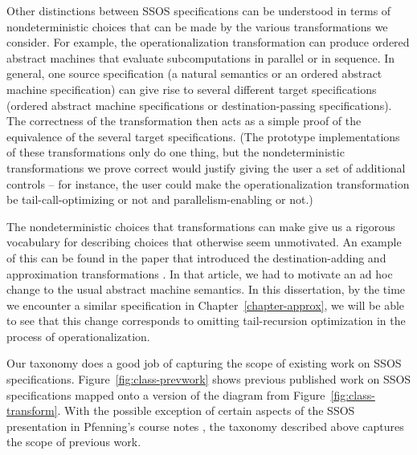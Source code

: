 Other distinctions between SSOS specifications can be understood in
terms of nondeterministic choices that can be made by the various
transformations we consider. For example, the operationalization
transformation can produce ordered abstract machines that evaluate
subcomputations in parallel or in sequence. In general, one source
specification (a natural semantics or an ordered abstract machine
specification) can give rise to several different target
specifications (ordered abstract machine specifications or
destination-passing specifications). The correctness of the
transformation then acts as a simple proof of the equivalence of the
several target specifications. (The prototype implementations of these
transformations only do one thing, but the nondeterministic
transformations we prove correct would justify giving the user a set
of additional controls -- for instance, the user could make the
operationalization transformation be tail-call-optimizing or
not and parallelism-enabling or not.)

The nondeterministic choices that transformations can make give us a
rigorous vocabulary for describing choices that otherwise seem
unmotivated. An example of this can be found in the paper that
introduced the destination-adding and approximation transformations
\cite{simmons11logical}. In that article, we had to motivate an ad hoc
change to the usual abstract machine semantics. In this dissertation,
by the time we encounter a similar specification in
Chapter~\ref{chapter-approx}, we will be able to see that this change
corresponds to omitting tail-recursion optimization in the process of
operationalization.

Our taxonomy does a good job of capturing the scope of existing work
on SSOS specifications.  Figure~\ref{fig:class-prevwork} shows
previous published work on SSOS specifications mapped onto a version
of the diagram from Figure~\ref{fig:class-transform}.  With the
possible exception of certain aspects of the SSOS presentation in
Pfenning's course notes \cite{pfenning12substructural}, the taxonomy
described above captures the scope of previous work.


